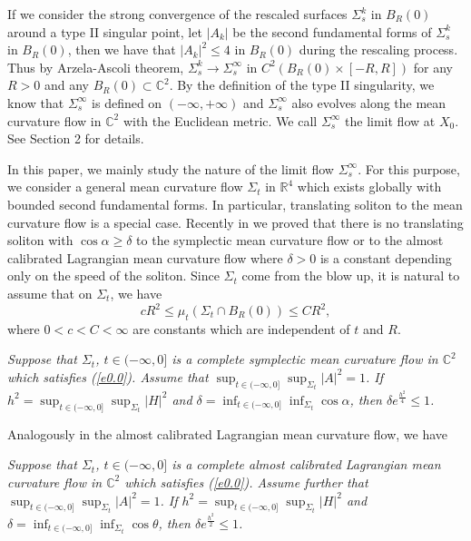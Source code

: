 If we consider the strong convergence of the rescaled surfaces
$\Sigma^k_s$ in $B_R(0)$ around a type II singular point, let
$|A_k|$ be the second fundamental forms of $\Sigma^k_s$ in
$B_R(0)$, then we have that $|A_k|^2\leq 4$ in $B_R(0)$ during the
rescaling process. Thus by Arzela-Ascoli theorem,
$\Sigma^k_s\to\Sigma^\infty_s$ in $C^2(B_R(0)\times [-R, R])$ for
any $R>0$ and any $B_R(0)\subset {\mathbb {C}}^2$. By the
definition of the type II singularity, we know that
$\Sigma^\infty_s$ is defined on $(-\infty, +\infty)$ and
$\Sigma_s^\infty$ also evolves along the mean curvature flow in
${\mathbb{C}}^2$ with the Euclidean metric. We call
$\Sigma^\infty_s$ the limit flow at $X_0$. See Section 2 for
details.

In this paper, we mainly study the nature of the limit flow
$\Sigma^\infty_s$. For this purpose, we consider a general mean
curvature flow $\Sigma_t$ in ${\mathbb{R}}^4$ which exists
globally with bounded second fundamental forms. In particular,
translating soliton to the mean curvature flow is a special case.
Recently in \cite{HL2} we proved that there is no translating
soliton with $\cos\alpha\geq\delta$ to the symplectic mean
curvature flow or to the almost calibrated Lagrangian mean
curvature flow where $\delta>0$ is a constant depending only on
the speed of the soliton. Since $\Sigma_t$ come from the blow up,
it is natural to assume that on $\Sigma_t$, we have
\begin{equation}\label{e0.0} cR^2\leq\mu_t(\Sigma_t\cap B_R(0))\leq
CR^2,
\end{equation} where $0<c<C<\infty$ are constants which are
independent of $t$ and $R$.

\vspace{.2in}

 {\it Suppose that $\Sigma_t$, $t\in
(-\infty, 0]$ is a complete symplectic mean curvature flow in
${\mathbb{C}}^2$ which satisfies (\ref{e0.0}). Assume that
$\sup_{t\in (-\infty, 0]}\sup_{\Sigma_t}|A|^2= 1$. If
$h^2=\sup_{t\in (-\infty, 0]}\sup_{\Sigma_t} |H|^2$ and
$\delta=\inf_{t\in (-\infty, 0]}\inf_{\Sigma_t}\cos\alpha$, then
$\delta e^{\frac{h^2}{4}}\leq 1$.}

\vspace{.1in}

Analogously in the almost calibrated Lagrangian mean curvature
flow, we have \vspace{.2in}

 {\it Suppose that $\Sigma_t$, $t\in
(-\infty, 0]$ is a complete almost calibrated Lagrangian mean
curvature flow in ${\mathbb{C}}^2$ which satisfies (\ref{e0.0}).
Assume further that $\sup_{t\in (-\infty, 0]}\sup_{\Sigma_t}|A|^2=
1$. If $h^2=\sup_{t\in (-\infty, 0]}\sup_{\Sigma_t} |H|^2$ and
$\delta=\inf_{t\in (-\infty, 0]}\inf_{\Sigma_t} \cos\theta$, then
$\delta e^{\frac{h^2}{2}}\leq 1$.} \vspace {.1in}

